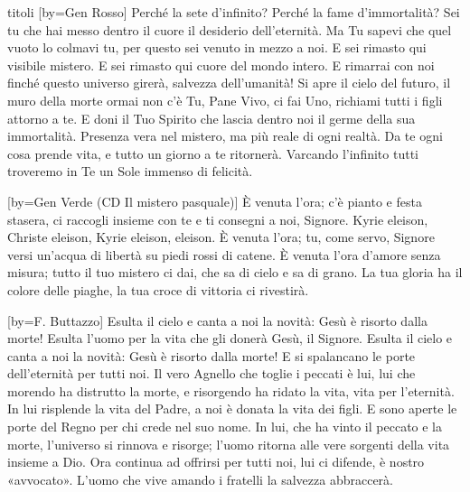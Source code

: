 \begin{songs}{titoli}
[by={Gen Rosso}]
\beginverse
Perché la sete d'infinito? Perché la fame d'immortalità?
Sei tu che hai messo dentro il cuore il desiderio dell'eternità.
Ma Tu sapevi che quel vuoto lo colmavi tu,
per questo sei venuto in mezzo a noi.
\endverse
\beginchorus
E sei rimasto qui visibile mistero.
E sei rimasto qui cuore del mondo intero.
E rimarrai con noi finché questo universo girerà, salvezza dell'umanità!
\endchorus
\beginverse
Si apre il cielo del futuro, il muro della morte ormai non c'è
Tu, Pane Vivo, ci fai Uno, richiami tutti i figli attorno a te.
E doni il Tuo Spirito che lascia dentro noi
il germe della sua immortalità.
\endverse
\beginverse
Presenza vera nel mistero, ma più reale di ogni realtà.
Da te ogni cosa prende vita, e tutto un giorno a te ritornerà.
Varcando l'infinito tutti troveremo in Te
un Sole immenso di felicità.
\endverse
\endsong

[by={Gen Verde (CD Il mistero pasquale)}]
\beginverse
È venuta l'ora; c'è pianto e festa stasera,
ci raccogli insieme con te e ti consegni a noi, Signore.
\endverse
\beginchorus
Kyrie eleison, Christe eleison, Kyrie eleison, eleison.
\endchorus
\beginverse
È venuta l'ora; tu, come servo, Signore
versi un'acqua di libertà su piedi rossi di catene.
\endverse
\beginverse
È venuta l'ora d'amore senza misura;
tutto il tuo mistero ci dai, che sa di cielo e sa di grano.
\endverse
\beginverse
La tua gloria ha il colore delle piaghe,
la tua croce di vittoria ci rivestirà.
\endverse
\endsong

[by={F. Buttazzo}]
\beginchorus
Esulta il cielo e canta a noi la novità:
Gesù è risorto dalla morte!
Esulta l'uomo per la vita che gli donerà
Gesù, il Signore.
Esulta il cielo e canta a noi la novità:
Gesù è risorto dalla morte!
E si spalancano le porte dell'eternità
per tutti noi.
\endchorus
\beginverse
Il vero Agnello che toglie i peccati è lui,
lui che morendo ha distrutto la morte,
e risorgendo ha ridato la vita,
vita per l'eternità.
\endverse
\beginverse
In lui risplende la vita del Padre,
a noi è donata la vita dei figli.
E sono aperte le porte del Regno
per chi crede nel suo nome.
\endverse
\beginverse
In lui, che ha vinto il peccato e la morte,
l'universo si rinnova e risorge;
l'uomo ritorna alle vere sorgenti
della vita insieme a Dio.
\endverse
\beginverse
Ora continua ad offrirsi per tutti noi,
lui ci difende, è nostro «avvocato».
L'uomo che vive amando i fratelli
la salvezza abbraccerà.
\endverse
\endsong


\end{songs}
